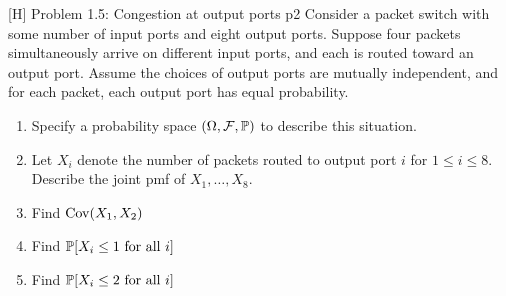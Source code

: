 \documentclass[a4paper, 11pt]{article}
\begin{document}
\begin{problem}{%
		[H] Problem 1.5: Congestion at output ports
	}{p2%
	}
Consider a packet switch with some number
of input ports and eight output ports. Suppose four packets simultaneously arrive
on different input ports, and each is routed toward an output port. Assume the
choices of output ports are mutually independent, and for each packet, each
output port has equal probability.\begin{enumerate}[label=(\alph*)]
	\item Specify a probability space $(\Omega,\mathcal{F},\mathbb{P})$ to describe this situation.
	\item Let $X_i$ denote the number of packets routed to output port $i$ for $1\leq i\leq 8$. Describe the joint pmf of $X_1,\dots,X_8$.
	\item Find $\operatorname{Cov}(X_1,X_2)$
	\item Find $\mathbb{P}[X_i\leq 1 \text{ for all $i$}]$
	\item Find $\mathbb{P}[X_i\leq 2 \text{ for all $i$}]$
\end{enumerate}
\end{problem}
\solve{
}

\newpage
\end{document}
